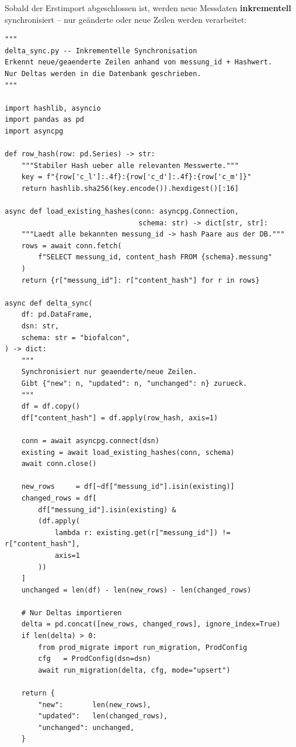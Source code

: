 \documentclass[12pt,a4paper]{report}
\theoremstyle{definition}
\theoremstyle{remark}
\begin{document}
Sobald der Erstimport abgeschlossen ist, werden neue Messdaten
\textbf{inkrementell} synchronisiert -- nur geänderte oder neue
Zeilen werden verarbeitet:

\begin{lstlisting}[style=python, caption={delta\_sync.py: Inkrementelle Synchronisation neuer Messdaten}]
"""
delta_sync.py -- Inkrementelle Synchronisation
Erkennt neue/geaenderte Zeilen anhand von messung_id + Hashwert.
Nur Deltas werden in die Datenbank geschrieben.
"""

import hashlib, asyncio
import pandas as pd
import asyncpg

def row_hash(row: pd.Series) -> str:
    """Stabiler Hash ueber alle relevanten Messwerte."""
    key = f"{row['c_l']:.4f}:{row['c_d']:.4f}:{row['c_m']}"
    return hashlib.sha256(key.encode()).hexdigest()[:16]

async def load_existing_hashes(conn: asyncpg.Connection,
                                schema: str) -> dict[str, str]:
    """Laedt alle bekannten messung_id -> hash Paare aus der DB."""
    rows = await conn.fetch(
        f"SELECT messung_id, content_hash FROM {schema}.messung"
    )
    return {r["messung_id"]: r["content_hash"] for r in rows}

async def delta_sync(
    df: pd.DataFrame,
    dsn: str,
    schema: str = "biofalcon",
) -> dict:
    """
    Synchronisiert nur geaenderte/neue Zeilen.
    Gibt {"new": n, "updated": n, "unchanged": n} zurueck.
    """
    df = df.copy()
    df["content_hash"] = df.apply(row_hash, axis=1)

    conn = await asyncpg.connect(dsn)
    existing = await load_existing_hashes(conn, schema)
    await conn.close()

    new_rows     = df[~df["messung_id"].isin(existing)]
    changed_rows = df[
        df["messung_id"].isin(existing) &
        (df.apply(
            lambda r: existing.get(r["messung_id"]) != r["content_hash"],
            axis=1
        ))
    ]
    unchanged = len(df) - len(new_rows) - len(changed_rows)

    # Nur Deltas importieren
    delta = pd.concat([new_rows, changed_rows], ignore_index=True)
    if len(delta) > 0:
        from prod_migrate import run_migration, ProdConfig
        cfg   = ProdConfig(dsn=dsn)
        await run_migration(delta, cfg, mode="upsert")

    return {
        "new":       len(new_rows),
        "updated":   len(changed_rows),
        "unchanged": unchanged,
    }
\end{lstlisting}
\end{document}
